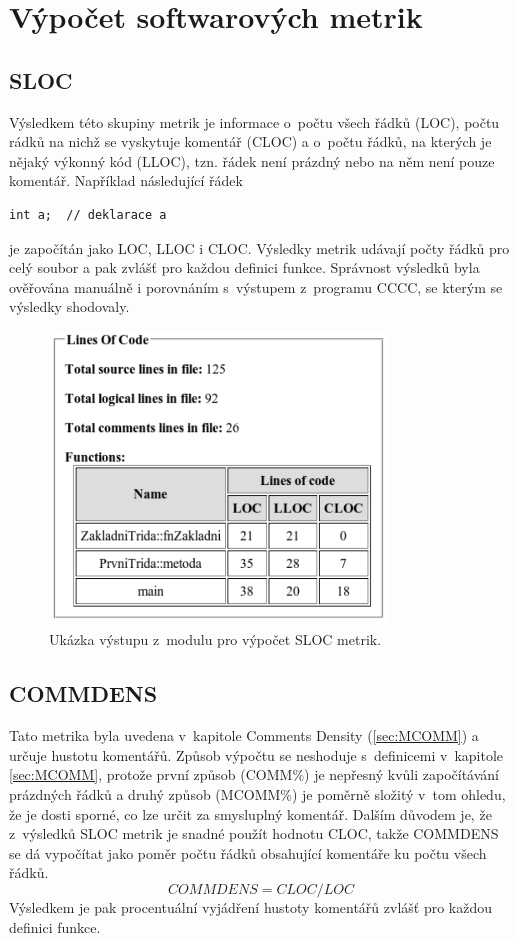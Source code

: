 \documentclass[11pt,twoside,a4paper]{book}
\begin{document}
\section{Výpočet softwarových metrik}

\subsection{SLOC}
Výsledkem této skupiny metrik je informace o~počtu všech řádků (LOC),
počtu rádků na nichž se vyskytuje komentář (CLOC) a o~počtu řádků, na kterých je
nějaký výkonný kód (LLOC), tzn. řádek není prázdný nebo na něm není pouze komentář.
Například následující řádek
\begin{verbatim}
int a;	// deklarace a
\end{verbatim}
je započítán jako LOC, LLOC i CLOC.
Výsledky metrik udávají počty řádků pro celý soubor a pak zvlášť pro každou definici funkce.
Správnost výsledků byla ověřována manuálně i porovnáním s~výstupem z~programu CCCC, se kterým se výsledky shodovaly.

\begin{figure}[H]
\begin{center}
\includegraphics[width=9cm]{figures/output_sloc.pdf}
\caption{Ukázka výstupu z~modulu pro výpočet SLOC metrik.}
\label{fig:out_sloc}
\end{center}
\end{figure}

\subsection{COMMDENS}
Tato metrika byla uvedena v~kapitole Comments Density (\ref{sec:MCOMM}) a určuje hustotu komentářů.
Způsob výpočtu se neshoduje s~definicemi v~kapitole \ref{sec:MCOMM}, protože první způsob (COMM\%)
je nepřesný kvůli započítávání prázdných řádků a druhý způsob (MCOMM\%) je poměrně složitý v~tom ohledu,
že je dosti sporné, co lze určit za smysluplný komentář. Dalším důvodem je, že z~výsledků SLOC metrik
je snadné použít hodnotu CLOC, takže COMMDENS se dá vypočítat jako poměr počtu řádků obsahující komentáře
ku počtu všech řádků.
$$COMMDENS = CLOC / LOC$$
Výsledkem je pak procentuální vyjádření hustoty komentářů zvlášť pro každou definici funkce.
\end{document}
